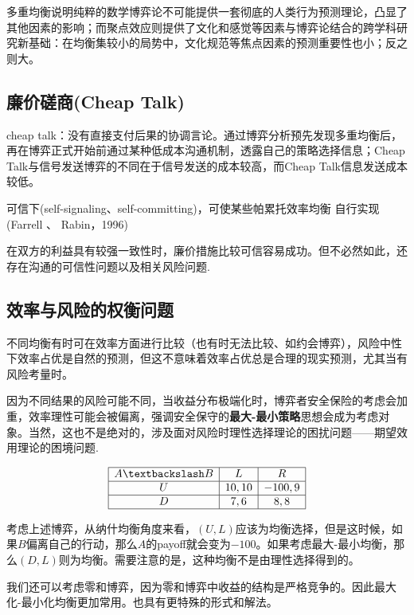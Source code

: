 \documentclass[UTF8,12pt]{ctexart}
\numberwithin{equation}{section} %
\numberwithin{figure}{section}
\numberwithin{table}{section}
\begin{document}
	多重均衡说明纯粹的数学博弈论不可能提供一套彻底的人类行为预测理论，凸显了其他因素的影响；而聚点效应则提供了文化和感觉等因素与博弈论结合的跨学科研究新基础：在均衡集较小的局势中，文化规范等焦点因素的预测重要性也小；反之则大。
	
	\subsection{廉价磋商(Cheap Talk)}
	cheap talk：没有直接支付后果的协调言论。通过博弈分析预先发现多重均衡后，再在博弈正式开始前通过某种低成本沟通机制，透露自己的策略选择信息；Cheap Talk与信号发送博弈的不同在于信号发送的成本较高，而Cheap Talk信息发送成本较低。
	
	可信下(self-signaling、self-committing)，可使某些帕累托效率均衡
	自行实现(Farrell 、 Rabin，1996)
	
	在双方的利益具有较强一致性时，廉价措施比较可信容易成功。但不必然如此，还存在沟通的可信性问题以及相关风险问题.
	
	\subsection{效率与风险的权衡问题}
	不同均衡有时可在效率方面进行比较（也有时无法比较、如约会博弈），风险中性下效率占优是自然的预测，但这不意味着效率占优总是合理的现实预测，尤其当有风险考量时。
	
	因为不同结果的风险可能不同，当收益分布极端化时，博弈者安全保险的考虑会加重，效率理性可能会被偏离，强调安全保守的\textbf{最大-最小策略}思想会成为考虑对象。当然，这也不是绝对的，涉及面对风险时理性选择理论的困扰问题——期望效用理论的困境问题.
	
	\begin{equation}
		\begin{array}{|c|c|c|}
			\hline
			A \textbackslash B & L & R \\
			\hline 
			U & 10,10 & -100,9 \\
			\hline 
			D & 7,6 & 8,8 \\
			\hline 
		\end{array}
	\end{equation}
	
	考虑上述博弈，从纳什均衡角度来看，$(U,L)$应该为均衡选择，但是这时候，如果$B$偏离自己的行动，那么$A$的payoff就会变为$-100$。如果考虑最大-最小均衡，那么$(D,L)$则为均衡。需要注意的是，这种均衡不是由理性选择得到的。
	
	我们还可以考虑零和博弈，因为零和博弈中收益的结构是严格竞争的。因此最大化-最小化均衡更加常用。也具有更特殊的形式和解法。
	
\end{document}
